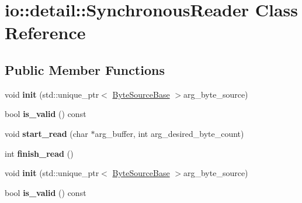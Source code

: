 \hypertarget{classio_1_1detail_1_1_synchronous_reader}{}\section{io\+:\+:detail\+:\+:Synchronous\+Reader Class Reference}
\label{classio_1_1detail_1_1_synchronous_reader}
\subsection*{Public Member Functions}
\begin{DoxyCompactItemize}
\item 
\mbox{\label{classio_1_1detail_1_1_synchronous_reader_a4dc78563ff667b92ad3096a94e834eb5}} 
void {\bfseries init} (std\+::unique\+\_\+ptr$<$ \hyperlink{classio_1_1_byte_source_base}{Byte\+Source\+Base} $>$arg\+\_\+byte\+\_\+source)
\item 
\mbox{\label{classio_1_1detail_1_1_synchronous_reader_a9d6b2c888cc7020df1bb81c8bb5c58bc}} 
bool {\bfseries is\+\_\+valid} () const
\item 
\mbox{\label{classio_1_1detail_1_1_synchronous_reader_a6cad1371b97e14f660914898b16433c4}} 
void {\bfseries start\+\_\+read} (char $\ast$arg\+\_\+buffer, int arg\+\_\+desired\+\_\+byte\+\_\+count)
\item 
\mbox{\label{classio_1_1detail_1_1_synchronous_reader_a519a0cb25c641d2e51b6542749c44606}} 
int {\bfseries finish\+\_\+read} ()
\item 
\mbox{\label{classio_1_1detail_1_1_synchronous_reader_a4dc78563ff667b92ad3096a94e834eb5}} 
void {\bfseries init} (std\+::unique\+\_\+ptr$<$ \hyperlink{classio_1_1_byte_source_base}{Byte\+Source\+Base} $>$arg\+\_\+byte\+\_\+source)
\item 
\mbox{\label{classio_1_1detail_1_1_synchronous_reader_a9d6b2c888cc7020df1bb81c8bb5c58bc}} 
bool {\bfseries is\+\_\+valid} () const
\item 
\mbox{\label{classio_1_1detail_1_1_synchronous_reader_a6cad1371b97e14f660914898b16433c4}} 

\end{DoxyCompactItemize}
